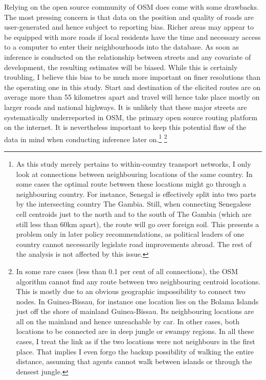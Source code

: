 \documentclass[11pt, oneside]{article}   	%
\begin{document}
Relying on the open source community of OSM does come with some drawbacks. The most pressing concern is that data on the position and quality of roads are user-generated and hence subject to reporting bias. Richer areas may appear to be equipped with more roads if local residents have the time and necessary access to a computer to enter their neighbourhoods into the database. As soon as inference is conducted on the relationship between streets and any covariate of development, the resulting estimates will be biased. While this is certainly troubling, I believe this bias to be much more important on finer resolutions than the operating one in this study. Start and destination of the elicited routes are on average more than 55 kilometres apart and travel will hence take place mostly on larger roads and national highways. It is unlikely that these major streets are systematically underreported in OSM, the primary open source routing platform on the internet. It is nevertheless important to keep this potential flaw of the data in mind when conducting inference later on.\footnote{As this study merely pertains to within-country transport networks, I only look at connections between neighbouring locations of the same country. In some cases the optimal route between these locations might go through a neighbouring country. For instance, Senegal is effectively split into two parts by the intersecting country The Gambia. Still, when connecting Senegalese cell centroids just to the north and to the south of The Gambia (which are still less than 60km apart), the route will go over foreign soil. This presents a problem only in later policy recommendations, as political leaders of one country cannot necessarily legislate road improvements abroad. The rest of the analysis is not affected by this issue.} \footnote{In some rare cases (less than 0.1 per cent of all connections), the OSM algorithm cannot find any route between two neighbouring centroid locations. This is mostly due to an obvious geographic impossibility to connect two nodes. In Guinea-Bissau, for instance one location lies on the Bolama Islands just off the shore of mainland Guinea-Bissau. Its neighbouring locations are all on the mainland and hence unreachable by car. In other cases, both locations to be connected are in deep jungle or swampy regions. In all these cases, I treat the link as if the two locations were not neighbours in the first place. That implies I even forgo the backup possibility of walking the entire distance, assuming that agents cannot walk between islands or through the densest jungle.}
\end{document}
